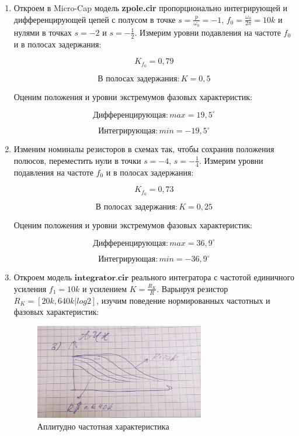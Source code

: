 \documentclass[a4paper, 12pt]{article}%
\begin{document}
\begin{enumerate}

\item Откроем в Micro-Cap модель \textbf{zpole.cir} пропорционально интегрирующей и дифференцирующей цепей с полусом в точке $s =\frac{p}{\omega_0} = -1$, $f_0 = \frac{\omega_0}{2\pi}= 10k$ и нулями в точках $s = -2$ и $s = -\frac{1}{2}$. Измерим уровни подавления на частоте $f_0$ и в полосах задержания:

\[K_{f_0} = 0,79\]

\[\text{В полосах задержания}: K = 0,5\]

Оценим положения и уровни экстремумов фазовых характеристик:

\[\text{Дифференцирующая}: max = 19,5^{\circ}\]

\[\text{Интегрирующая}: min = -19,5^{\circ}\]

\item Изменим номиналы резисторов в схемах так, чтобы сохранив положения полюсов, переместить нули в точки $s = -4$, $s = -\frac{1}{4}$. Измерим уровни подавления на частоте $f_0$ и в полосах задержания:

\[K_{f_0} = 0,73\]

\[\text{В полосах задержания}: K = 0,25\]

Оценим положения и уровни экстремумов фазовых характеристик:

\[\text{Дифференцирующая}: max = 36,9^{\circ}\]

\[\text{Интегрирующая}: min = -36,9^{\circ}\]

\item Откроем модель $\textbf{integrator.cir}$ реального интегратора с частотой единичного усиления $f_1 = 10k$ и усилением $K = \frac{R_K}{R}$. Варьируя резистор $R_K = [20k, 640k|log2]$, изучим поведение нормированных частотных и фазовых характеристик:

\begin{figure}[h!]
\centering	
\includegraphics[width=0.7\textwidth]{images/1_3.jpg}
\caption{Аплитудно частотная характеристика}
\label{1_3}
\end{figure}


\end{enumerate}
\end{document}
